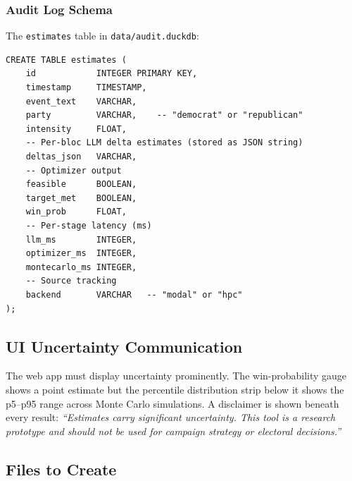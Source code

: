 \documentclass[11pt]{article}
\begin{document}
\subsubsection*{Audit Log Schema}

The \texttt{estimates} table in \texttt{data/audit.duckdb}:

\begin{lstlisting}
CREATE TABLE estimates (
    id            INTEGER PRIMARY KEY,
    timestamp     TIMESTAMP,
    event_text    VARCHAR,
    party         VARCHAR,    -- "democrat" or "republican"
    intensity     FLOAT,
    -- Per-bloc LLM delta estimates (stored as JSON string)
    deltas_json   VARCHAR,
    -- Optimizer output
    feasible      BOOLEAN,
    target_met    BOOLEAN,
    win_prob      FLOAT,
    -- Per-stage latency (ms)
    llm_ms        INTEGER,
    optimizer_ms  INTEGER,
    montecarlo_ms INTEGER,
    -- Source tracking
    backend       VARCHAR   -- "modal" or "hpc"
);
\end{lstlisting}

\subsection*{UI Uncertainty Communication}

The web app must display uncertainty prominently. The win-probability gauge shows a
point estimate but the percentile distribution strip below it shows the p5--p95 range
across Monte Carlo simulations. A disclaimer is shown beneath every result:
\textit{``Estimates carry significant uncertainty. This tool is a research prototype
and should not be used for campaign strategy or electoral decisions.''}

\subsection*{Files to Create}
\end{document}
